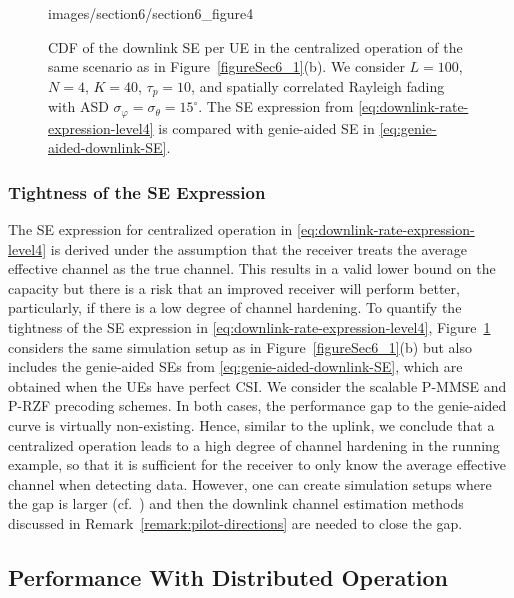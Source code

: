 \begin{figure}[t!]\centering
	\begin{overpic}[width=0.88\columnwidth,tics=10]{images/section6/section6_figure4}
	\end{overpic} 
	\caption{CDF of the downlink SE per UE in the centralized operation of the same scenario as in Figure~\ref{figureSec6_1}(b). We consider $L=100$, $N=4$, $K=40$, $\tau_p=10$, and spatially correlated Rayleigh  fading with ASD $\sigma_{\varphi}=\sigma_{\theta}=15^{\circ}$. The SE expression from \eqref{eq:downlink-rate-expression-level4} is compared with genie-aided SE in \eqref{eq:genie-aided-downlink-SE}.}    \vspace{+2mm}
	\label{figureSec6_1x} 
\end{figure}

\subsubsection{Tightness of the SE Expression}

The  SE expression for centralized operation in \eqref{eq:downlink-rate-expression-level4} is derived under the assumption that the receiver treats the average effective channel as the true channel. This results in a valid lower bound on the capacity but there is a risk that an improved receiver will perform better, particularly, if there is a low degree of channel hardening.
To quantify the tightness of the SE expression in \eqref{eq:downlink-rate-expression-level4}, Figure~\ref{figureSec6_1x} considers the same simulation setup as in Figure~\ref{figureSec6_1}(b) but also includes the genie-aided SEs from \eqref{eq:genie-aided-downlink-SE}, which are obtained when the UEs have perfect CSI. We consider the scalable P-MMSE and P-RZF precoding schemes. In both cases, the performance gap to the genie-aided curve is virtually non-existing. Hence, similar to the uplink, we conclude that a centralized operation leads to a high degree of channel hardening in the running example, so that it is sufficient for the receiver to only know the average effective channel when detecting data.
However, one can create simulation setups where the gap is larger (cf.~\cite{Chen2018b}) and then the downlink channel estimation methods discussed in Remark~\ref{remark:pilot-directions} are needed to close the gap.



\subsection{Performance With Distributed Operation}

